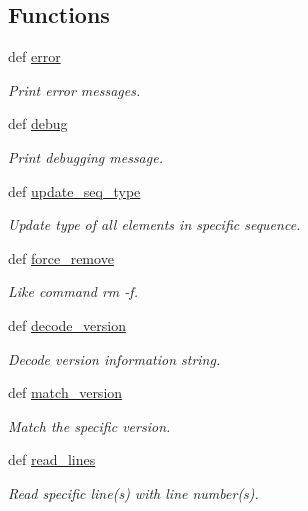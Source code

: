 \subsection*{Functions}
\begin{DoxyCompactItemize}
\item 
def \hyperlink{namespaceadmin_ae1e80d1a965f6551fa95ff379ba2b0cd}{error}
\begin{DoxyCompactList}\small\item\em Print error messages. \end{DoxyCompactList}\item 
def \hyperlink{namespaceadmin_a575bcc44ebed9e68574ccb636a66a4d2}{debug}
\begin{DoxyCompactList}\small\item\em Print debugging message. \end{DoxyCompactList}\item 
def \hyperlink{namespaceadmin_ae1dbeff3e935d67ed99b95eb814c9a11}{update\-\_\-seq\-\_\-type}
\begin{DoxyCompactList}\small\item\em Update type of all elements in specific sequence. \end{DoxyCompactList}\item 
def \hyperlink{namespaceadmin_a8b0cb2905f04979a2db7cf3bb181ad00}{force\-\_\-remove}
\begin{DoxyCompactList}\small\item\em Like command {\ttfamily rm -\/f}. \end{DoxyCompactList}\item 
def \hyperlink{namespaceadmin_a2605170b60fdae0f26432f209ed71f49}{decode\-\_\-version}
\begin{DoxyCompactList}\small\item\em Decode version information string. \end{DoxyCompactList}\item 
def \hyperlink{namespaceadmin_a89c4e2a6cc63b64d27825da9eb414b98}{match\-\_\-version}
\begin{DoxyCompactList}\small\item\em Match the specific version. \end{DoxyCompactList}\item 
def \hyperlink{namespaceadmin_ae034627a9fca691b23ee55d255113a81}{read\-\_\-lines}
\begin{DoxyCompactList}\small\item\em Read specific line(s) with line number(s). \end{DoxyCompactList}\end{DoxyCompactItemize}

